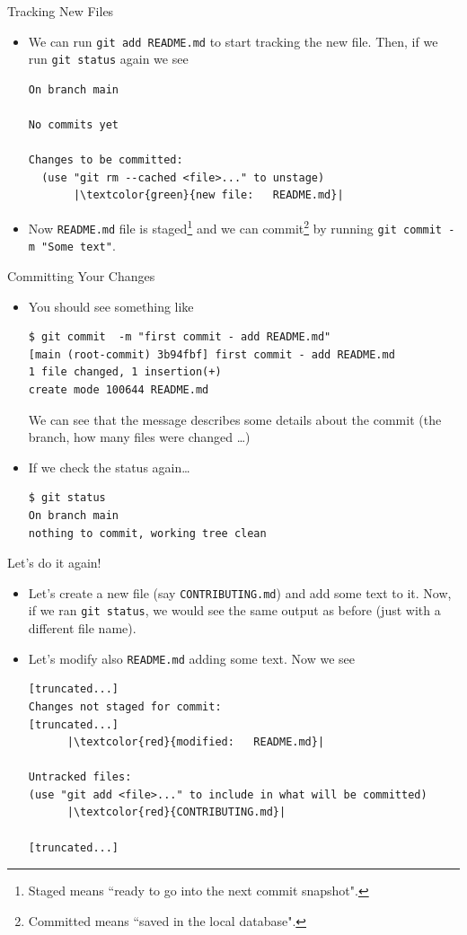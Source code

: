 \documentclass[
hyperref={bookmarks=false},
xcolor={dvipsnames,svgnames*,x11names*}, 
12pt
]{beamer}
\begin{document}
\begin{frame}[fragile]{Tracking New Files}
\vspace{-0.5cm}
\begin{itemize}
\itemsep 2ex
\item We can run \texttt{git add README.md} to start tracking the new file. Then, if we run \texttt{git status} again we see
\begin{lstlisting}
On branch main

No commits yet

Changes to be committed:
  (use "git rm --cached <file>..." to unstage)
       |\textcolor{green}{new file:   README.md}|
\end{lstlisting}
\item Now \texttt{README.md} file is staged\footnote{Staged means ``ready to go into the next commit snapshot".} and we can commit\footnote{Committed means ``saved in the local database".} by running \texttt{git commit -m "Some text"}.  
\end{itemize}
\end{frame}

\begin{frame}[fragile]{Committing Your Changes}
\vspace{-0.5cm}
\begin{itemize}
\itemsep 2ex
\item You should see something like
\begin{lstlisting}
$ git commit  -m "first commit - add README.md"
[main (root-commit) 3b94fbf] first commit - add README.md
1 file changed, 1 insertion(+)
create mode 100644 README.md
\end{lstlisting}
We can see that the message describes some details about the commit (the branch, how many files were changed \dots)
\item If we check the status again\dots
\begin{lstlisting}
$ git status
On branch main
nothing to commit, working tree clean	
\end{lstlisting}
\end{itemize}
\end{frame}

\begin{frame}[fragile]{Let's do it again!}
\vspace{-0.5cm}
\begin{itemize}
\itemsep 2ex
\item Let's create a new file (say \texttt{CONTRIBUTING.md}) and add some text to it. Now, if we ran \texttt{git status}, we would see the same output as before (just with a different file name). 
\item Let's modify also \texttt{README.md} adding some text. Now we see
\begin{lstlisting}
[truncated...]
Changes not staged for commit:
[truncated...]
      |\textcolor{red}{modified:   README.md}|

Untracked files:
(use "git add <file>..." to include in what will be committed)
      |\textcolor{red}{CONTRIBUTING.md}|

[truncated...]
\end{lstlisting}
\end{itemize}
\end{frame}
\end{document}
